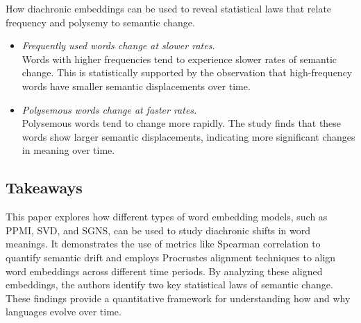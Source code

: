 How diachronic embeddings can be used to reveal statistical laws that relate frequency and polysemy to semantic change.

\begin{itemize}
    \item {} \emph{Frequently used words change at slower rates.}\\
    Words with higher frequencies tend to experience slower rates of semantic change.
    This is statistically supported by the observation that high-frequency words have smaller semantic displacements over time.
    \item {} \emph{Polysemous words change at faster rates.}\\
    Polysemous words tend to change more rapidly.
    The study finds that these words show larger semantic displacements, indicating more significant changes in meaning over time.
\end{itemize}

\subsection{Takeaways}
This paper explores how different types of word embedding models, such as PPMI, SVD, and SGNS, can be used to study diachronic shifts in word meanings.
It demonstrates the use of metrics like Spearman correlation to quantify semantic drift and employs Procrustes alignment techniques to align word embeddings across different time periods.
By analyzing these aligned embeddings, the authors identify two key statistical laws of semantic change.
These findings provide a quantitative framework for understanding how and why languages evolve over time.


